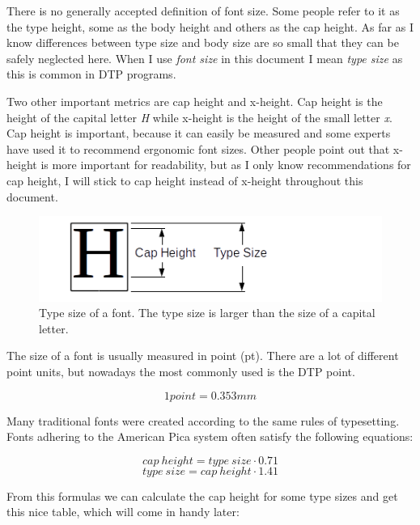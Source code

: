 There is no generally accepted definition of font size. Some people
refer to it as the type height, some as the body height and others as
the cap height. As far as I know differences between type size and body
size are so small that they can be safely neglected here. When I use
\emph{font size} in this document I mean \emph{type size} as this is
common in DTP programs.

Two other important metrics are cap height and x-height. Cap height is
the height of the capital letter \emph{H} while x-height is the height
of the small letter \emph{x}. Cap height is important, because it can
easily be measured and some experts have used it to recommend ergonomic
font sizes. Other people point out that x-height is more important for
readability, but as I only know recommendations for cap height, I will
stick to cap height instead of x-height throughout this document.

\begin{figure}[ht]
\centering
\includegraphics[width=12cm]{img/fontmetrics.png}
\caption{Type size of a font. The type size is larger than the
size of a capital letter.}
\end{figure}

The size of a font is usually measured in point (pt). There are a lot
of different point units, but nowadays the most commonly used is the DTP
point.

$$ 1 point = 0.353 mm $$

Many traditional fonts were created according to the same rules of
typesetting. Fonts adhering to the American Pica system often satisfy
the following equations:

$$ cap\ height = type\ size \cdot 0.71 $$
$$ type\ size = cap\ height \cdot 1.41 $$

From this formulas we can calculate the cap height for some type sizes
and get this nice table, which will come in handy later:

